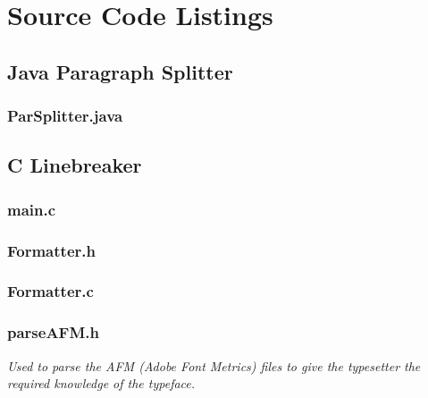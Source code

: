 \chapter{Source Code Listings}


\section{Java Paragraph Splitter}
\label{app:parsplitter}
\subsection{ParSplitter.java}


\newpage

\section{C Linebreaker}
\label{app:linebreaker}
\subsection{main.c}


\newpage

\subsection{Formatter.h}


\newpage

\subsection{Formatter.c}


\newpage

\subsection{parseAFM.h}
\emph{Used to parse the AFM (Adobe Font Metrics) files to give the typesetter the required knowledge of the typeface.}


